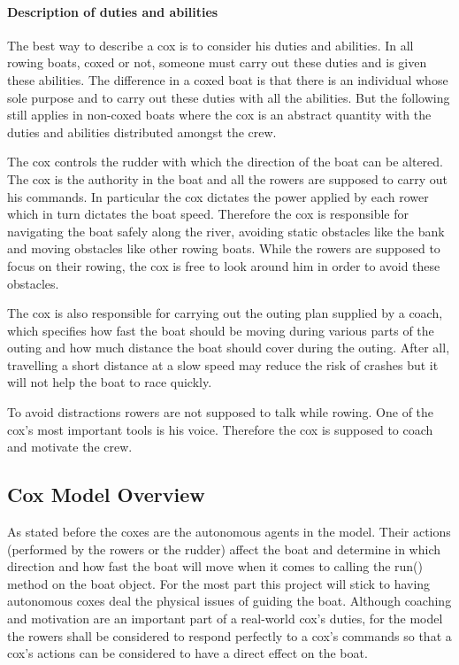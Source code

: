       \paragraph{Description of duties and abilities}
      The best way to describe a cox is to consider his duties and abilities. In all rowing boats, coxed or not, someone must carry out these duties and is given these abilities. The difference in a coxed boat is that there is an individual whose sole purpose and to carry out these duties with all the abilities. But the following still applies in non-coxed boats where the cox is an abstract quantity with the duties and abilities distributed amongst the crew.
      
      The cox controls the rudder with which the direction of the boat can be altered. The cox is the authority in the boat and all the rowers are supposed to carry out his commands. In particular the cox dictates the power applied by each rower which in turn dictates the boat speed. Therefore the cox is responsible for navigating the boat safely along the river, avoiding static obstacles like the bank and moving obstacles like other rowing boats. While the rowers are supposed to focus on their rowing, the cox is free to look around him in order to avoid these obstacles. 
      
      The cox is also responsible for carrying out the outing plan supplied by a coach, which specifies how fast the boat should be moving during various parts of the outing and how much distance the boat should cover during the outing. After all, travelling a short distance at a slow speed may reduce the risk of crashes but it will not help the boat to race quickly.
      
      To avoid distractions rowers are not supposed to talk while rowing. One of the cox's most important tools is his voice. Therefore the cox is supposed to coach and motivate the crew.
      
      \subsection{Cox Model Overview}
      As stated before the coxes are the autonomous agents in the model. Their actions (performed by the rowers or the rudder) affect the boat and determine in which direction and how fast the boat will move when it comes to calling the run() method on the boat object. For the most part this project will stick to having autonomous coxes deal the physical issues of guiding the boat. Although coaching and motivation are an important part of a real-world cox's duties, for the model the rowers shall be considered to respond perfectly to a cox's commands so that a cox's actions can be considered to have a direct effect on the boat.
      

